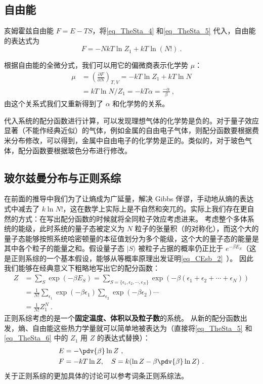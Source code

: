 \subsection{自由能}
亥姆霍兹自由能 $F=E-TS$，将\autoref{eq_TheSta_4} 和\autoref{eq_TheSta_5} 代入，自由能的表达式为
\begin{equation}\label{eq_TheSta_6}
F=-NkT\ln Z_1+kT\ln(N!)~.
\end{equation}

根据自由能的全微分式，我们可以用它的偏微商表示化学势 $\mu$：
\begin{equation}
\begin{aligned}
\mu&=\left(\frac{\partial F}{\partial N}\right)_{T,V}=-kT\ln Z_1+kT\ln N\\
&=kT\ln N/Z_1=-kT\alpha=\frac{-\alpha}{\beta}~,
\end{aligned}
\end{equation}
由这个关系式我们又重新得到了 $\alpha$ 和化学势的关系。

代入系统的配分函数进行计算，可以发现理想气体的化学势是负的。对于量子效应显著（不能作经典近似）的气体，例如金属的自由电子气体，则配分函数要根据费米分布修改，可以得到，金属中自由电子的化学势是正的。类似的，对于玻色气体，配分函数要根据玻色分布进行修改。

\subsection{玻尔兹曼分布与正则系综}
在前面的推导中我们为了让熵成为广延量，解决 Gibbs 佯谬，手动地从熵的表达式中减去了 $k\ln N!$，这在数学上实际上是不自然和突兀的。实际上我们存在更自然的方式：在写出配分函数的时候就将全同粒子效应考虑进来。
考虑整个多体系统的能级，此时系统的量子态被定义为 $N$ 粒子的张量积（的对称化），而这个大的量子态能够按照系统哈密顿量的本征值划分为多个能级，这个大的量子态的能量是其中各个粒子的能量之和。假设量子态 $|S\rangle$ 被粒子占据的概率仍正比于 $e^{-\beta E_S}$（这是正则系综的一个基本假设，能够从等概率原理出发证明\autoref{eq_CEsb_2}~）。 因此我们能够在经典意义下粗略地写出它的配分函数：
\begin{equation}
\begin{aligned}
Z&=\sum_{S} \exp(-\beta E_S)=\sum_{S=\{\epsilon_1,\epsilon_2,\cdots,\epsilon_N\}}\exp(-\beta(\epsilon_1+\epsilon_2+\cdots+\epsilon_N))\\
&=\frac{1}{N!} \sum_{\epsilon_1}\exp(-\beta \epsilon_1) \sum_{\epsilon_2}\exp(-\beta\epsilon_2)\cdots\\
&=\frac{1}{N!}Z_1^N~.
\end{aligned}
\end{equation}
正则系综考虑的是一个\textbf{固定温度、体积以及粒子数}的系统。
从新的配分函数出发，熵、自由能这些热力学量就可以简单地被表达为（直接将\autoref{eq_TheSta_5} 和 \autoref{eq_TheSta_6} 中的 $Z_1$ 用 $Z$ 的表达式替换）：
\begin{equation}
\begin{aligned}
&E=-\pdv{\beta}\ln Z~,\\
&F=-kT\ln Z,\quad S=k(\ln Z-\beta \pdv{\beta}\ln Z)~.
\end{aligned}
\end{equation}
关于正则系综的更加具体的讨论可以参考词条正则系综法。
